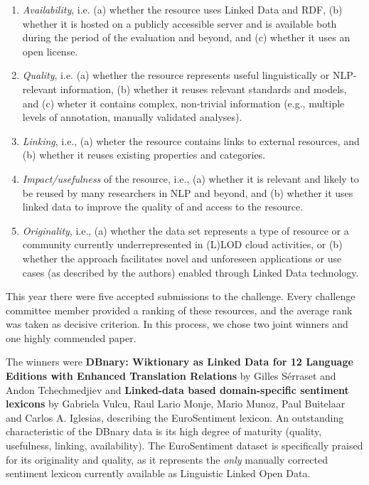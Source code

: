 \begin{enumerate}[1.]
\item \emph{Availability}, i.e. (a) whether the resource uses Linked Data and RDF, (b) whether it is hosted on a publicly accessible server and is available both during the period of the evaluation and beyond, and (c) whether it uses an open license.
\item \emph{Quality}, i.e. (a) whether the resource represents useful linguistically or NLP-relevant information, (b) whether it reuses relevant standards and models, and (c) wheter it contains complex, non-trivial information (e.g., multiple levels of annotation, manually validated analyses).
\item \emph{Linking}, i.e., (a) wheter the resource contains links to external resources, and (b) whether it reuses existing properties and categories.
\item \emph{Impact/usefulness} of the resource, i.e., (a) whether it is relevant and likely to be reused by many researchers in NLP and beyond, and (b) whether it uses linked data to improve the quality of and access to the resource.
\item \emph{Originality}, i.e., (a) whether the data set represents a type of resource or a community currently underrepresented in (L)LOD cloud activities, or (b) whether the approach facilitates novel and unforeseen applications or use cases (as described by the authors) enabled through Linked Data technology.
\end{enumerate}

\noindent	
This year there were five accepted submissions to the challenge. 
Every challenge committee member provided a ranking of these resources, and the average rank was taken as decisive criterion.
In this process, we chose two joint winners and one highly commended paper. 

The winners 
were \textbf{DBnary: Wiktionary as Linked Data for 12 Language Editions with Enhanced 
Translation Relations} by Gilles Sérraset and Andon Tchechmedjiev and \textbf{Linked-data 
based domain-specific sentiment lexicons} by Gabriela Vulcu, Raul Lario Monje, 
Mario Munoz, Paul Buitelaar and Carlos A. Iglesias, describing the EuroSentiment 
lexicon. 
An outstanding characteristic of the DBnary data is its high degree of maturity (quality, usefulness, linking, availability). 
The EuroSentiment dataset is specifically praised for its originality and quality, as it represents the \emph{only} manually corrected sentiment lexicon currently available as Linguistic Linked Open Data.

